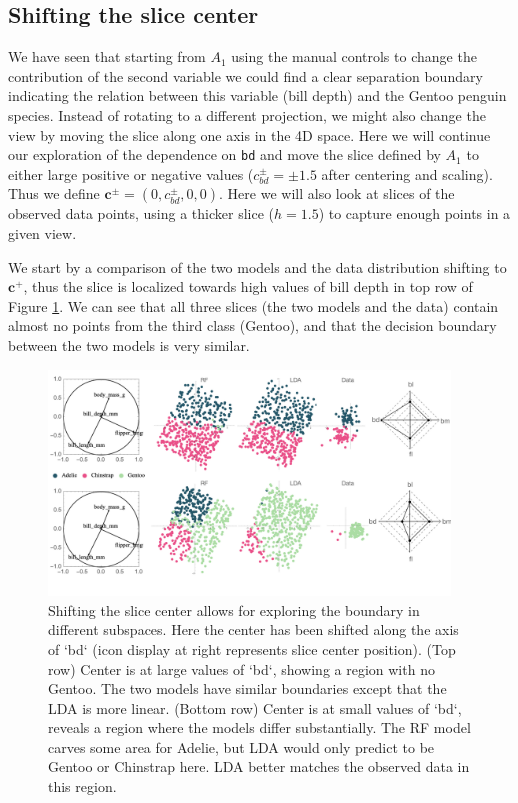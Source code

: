 \documentclass[]{interact}
\theoremstyle{plain}%
\theoremstyle{definition}
\theoremstyle{remark}
\begin{document}
\hypertarget{shifting-the-slice-center}{%
\subsection{Shifting the slice center}\label{shifting-the-slice-center}}

We have seen that starting from \(A_1\) using the manual controls to
change the contribution of the second variable we could find a clear
separation boundary indicating the relation between this variable (bill
depth) and the Gentoo penguin species. Instead of rotating to a
different projection, we might also change the view by moving the slice
along one axis in the 4D space. Here we will continue our exploration of
the dependence on \texttt{bd} and move the slice defined by \(A_1\) to
either large positive or negative values (\(c^{\pm}_{bd} = \pm 1.5\)
after centering and scaling). Thus we define
\(\mathbf{c}^{\pm} = (0, c^{\pm}_{bd}, 0, 0)\). Here we will also look
at slices of the observed data points, using a thicker slice (\(h=1.5\))
to capture enough points in a given view.

We start by a comparison of the two models and the data distribution
shifting to \(\mathbf{c}^{+}\), thus the slice is localized towards high
values of bill depth in top row of Figure \ref{slice1p}. We can see that
all three slices (the two models and the data) contain almost no points
from the third class (Gentoo), and that the decision boundary between
the two models is very similar.

\begin{figure}[ht]
\centerline{\includegraphics[width=0.95\textwidth]{figures/slice1_p.pdf}}
\caption{Shifting the slice center allows for exploring the boundary in different subspaces. Here the center has been shifted along the axis of `bd` (icon display at right represents slice center position). (Top row) Center is at large values of `bd`, showing a region with no Gentoo. The two models have similar boundaries except that the LDA is more linear. (Bottom row) Center is at small values of `bd`, reveals a region where the models differ substantially. The RF model carves some area for Adelie, but LDA would only predict to be Gentoo or Chinstrap here. LDA better matches the observed data in this region.}
\label{slice1p}
\end{figure}
\end{document}
